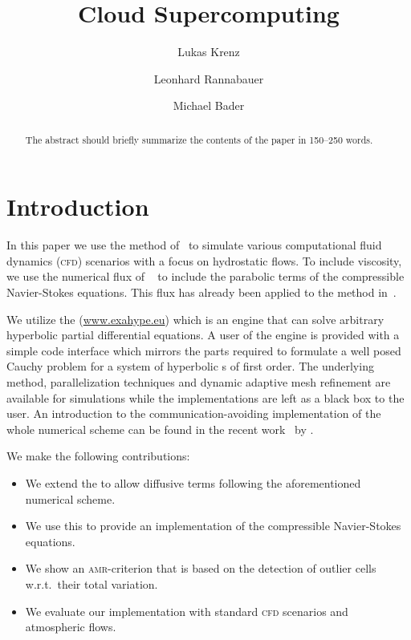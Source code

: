 \documentclass[runningheads]{llncs}
\title{Cloud Supercomputing}
\author{Lukas Krenz\inst{1} \and{} Leonhard Rannabauer\inst{1} \and{} Michael Bader\inst{1}}
\institute{Technical University of Munich} %
\begin{document}
\maketitle
\begin{abstract}
The abstract should briefly summarize the contents of the paper in
150--250 words.

\end{abstract}
\section{Introduction}
In this paper we use the \aderdg{} method of~\cite{dumbser2008unified} to simulate various computational fluid dynamics (\textsc{cfd}) scenarios with a focus on hydrostatic flows.
To include viscosity, we use the numerical flux of \citeauthor{gassner2008discontinuous}~\cite{gassner2008discontinuous} to include the parabolic terms of the compressible Navier-Stokes equations.
This flux has already been applied to the \aderdg{} method in~\cite{dumbser2010arbitrary}.

We utilize the \exahypeengine{} (\url{www.exahype.eu}) which is an engine that can solve arbitrary hyperbolic partial differential equations.
A user of the engine is provided with a simple code interface which mirrors the parts required to formulate a well posed Cauchy problem for a system of hyperbolic \pde{}s of first order.
The underlying \aderdg{} method, parallelization techniques and dynamic adaptive mesh refinement are available for simulations while the implementations are left as a black box to the user.
An introduction to the communication-avoiding implementation of the whole numerical scheme can be found in the recent work~\cite{charrier2018stop} by \citeauthor{charrier2018stop}.

We make the following contributions:
\begin{itemize}%
\item We extend the \exahypeengine{} to allow diffusive terms following the aforementioned numerical scheme.
\item We use this to provide an implementation of the compressible Navier-Stokes equations.
\item We show an \textsc{amr}-criterion that is based on the detection of outlier cells w.r.t.\ their total variation.
\item We evaluate our implementation with standard \textsc{cfd} scenarios and atmospheric flows.
\end{itemize}
\end{document}
